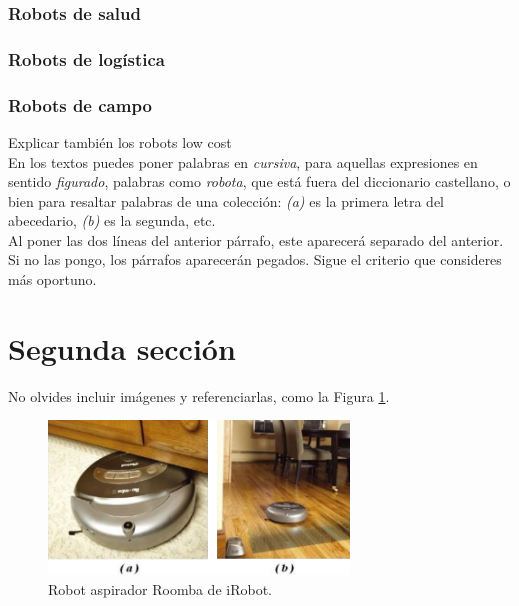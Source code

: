 \subsubsection{Robots de salud}

\subsubsection{Robots de logística}


\subsubsection{Robots de campo}


Explicar también los robots low cost\\




En los textos puedes poner palabras en \textit{cursiva}, para aquellas expresiones en sentido \textit{figurado}, palabras como \textit{robota}, que está fuera del diccionario castellano, o bien para resaltar palabras de una colección: \textit{(a)} es la primera letra del abecedario, \textit{(b)} es la segunda, etc.\\

Al poner las dos líneas del anterior párrafo, este aparecerá separado del anterior. Si no las pongo, los párrafos aparecerán pegados. Sigue el criterio que consideres más oportuno.

\section{Segunda sección}
\label{sec:segundaseccion}

No olvides incluir imágenes y referenciarlas, como la Figura \ref{fig:roomba}.

\begin{figure} [h!]
  \begin{center}
    \includegraphics[width=8cm]{figs/roomba}
  \end{center}
  \caption{Robot aspirador Roomba de iRobot.}
  \label{fig:roomba}
\end{figure}\

